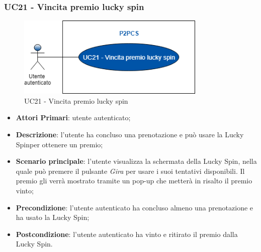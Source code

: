 \subsubsection{UC21 - Vincita premio lucky spin}
\begin{figure}[h]
	\includegraphics[width=9cm]{res/images/uc21.png}
	\centering
	\caption{UC21 - Vincita premio lucky spin}
\end{figure}
\begin{itemize}
	\item \textbf{Attori Primari}: utente autenticato;
	\item \textbf{Descrizione}: l'utente ha concluso una prenotazione e può usare la Lucky Spin\glosp per ottenere un premio;	
	\item \textbf{Scenario principale}: l'utente visualizza la schermata della Lucky Spin, nella quale può premere il pulsante \textit{Gira} per usare i suoi tentativi disponibili. Il premio gli verrà mostrato tramite un pop-up che metterà in risalto il premio vinto;
	\item \textbf{Precondizione}: l'utente autenticato ha concluso almeno una prenotazione e ha usato la Lucky Spin;
	\item \textbf{Postcondizione}: l'utente autenticato ha vinto e ritirato il premio dalla Lucky Spin.
\end{itemize}
